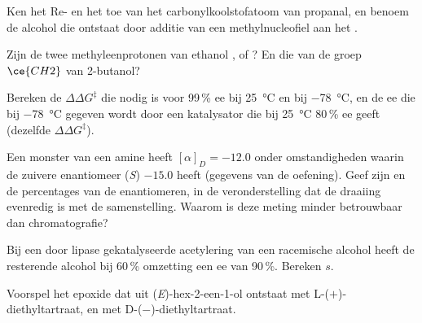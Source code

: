 \begin{exercise}[$\star$]\label{exo:b3:asymmetric-synthesis:3}
Ken het Re- en het  toe van het carbonylkoolstofatoom van
propanal, en benoem de alcohol die ontstaat door additie van een
methylnucleofiel aan het .
\end{exercise}

\begin{exercise}[$\star$]\label{exo:b3:asymmetric-synthesis:4}
Zijn de twee methyleenprotonen van ethanol ,  of ?
En die van de groep $\ce{CH2}$ van 2-butanol?
\end{exercise}

\begin{exercise}[$\star\star$]\label{exo:b3:asymmetric-synthesis:5}
Bereken de $\Delta\Delta G^\ddagger$ die nodig is voor 99\,\% ee bij \qty{25}{\celsius} en bij \qty{-78}{\celsius}, en de ee die bij \qty{-78}{\celsius}
gegeven wordt door een katalysator die bij \qty{25}{\celsius} 80\,\% ee geeft (dezelfde $\Delta\Delta G^\ddagger$).
\end{exercise}

\begin{exercise}[$\star\star$]\label{exo:b3:asymmetric-synthesis:6}
Een monster van een amine heeft $[\alpha]_D = -12.0$ onder omstandigheden waarin de zuivere enantiomeer (\textit{S})
$-15.0$ heeft (gegevens van de oefening). Geef zijn  en
de percentages van de enantiomeren, in de veronderstelling dat de
draaiing evenredig is met de samenstelling. Waarom is deze meting minder
betrouwbaar dan chromatografie?
\end{exercise}

\begin{exercise}[$\star\star$]\label{exo:b3:asymmetric-synthesis:7}
Bij een door lipase gekatalyseerde acetylering van een racemische
alcohol heeft de resterende alcohol bij 60\,\% omzetting een ee van
90\,\%. Bereken $s$.
\end{exercise}

\begin{exercise}[$\star\star$]\label{exo:b3:asymmetric-synthesis:8}
Voorspel het epoxide dat uit (\textit{E})-hex-2-een-1-ol ontstaat met L-($+$)-diethyltartraat, en met
D-($-$)-diethyltartraat.
\end{exercise}

